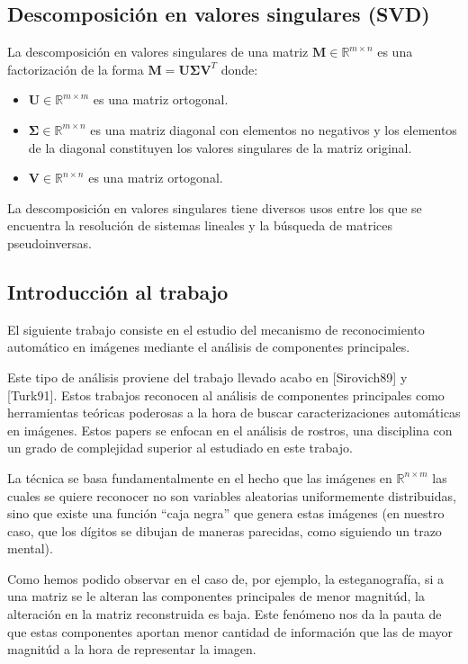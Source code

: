 \subsection{Descomposici\'on en valores singulares (SVD)}

La descomposici\'on en valores singulares de una matriz $\mathbf{M} \in \mathbb{R}^{m \times n}$ es una factorizaci\'on de la forma $\mathbf{M} =
\mathbf{U} \boldsymbol{\Sigma} \mathbf{V}^T$ donde:

\begin{itemize}
  \item $\mathbf{U} \in \mathbb{R}^{m \times m}$ es una matriz ortogonal.
  \item $\boldsymbol{\Sigma} \in \mathbb{R}^{m \times n}$ es una matriz diagonal con elementos no negativos y los elementos de la
diagonal constituyen los valores singulares de la matriz original.
  \item $\mathbf{V} \in \mathbb{R}^{n \times n}$ es una matriz ortogonal.
\end{itemize}

La descomposici\'on en valores singulares tiene diversos usos entre los que se encuentra la resoluci\'on de
sistemas lineales y la b\'usqueda de matrices pseudoinversas.

\subsection{Introducci\'on al trabajo}

El siguiente trabajo consiste en el estudio del mecanismo de reconocimiento autom\'atico
en im\'agenes mediante el an\'alisis de componentes principales.

Este tipo de an\'alisis proviene del trabajo llevado acabo en [Sirovich89] y [Turk91]. Estos
trabajos reconocen al an\'alisis de componentes principales como herramientas te\'oricas poderosas
a la hora de buscar caracterizaciones autom\'aticas en im\'agenes. Estos papers se enfocan en el
an\'alisis de rostros, una disciplina con un grado de complejidad superior al estudiado en este
trabajo.

La t\'ecnica se basa fundamentalmente en el hecho que las im\'agenes en $\mathbb{R}^{n \times m}$ las cuales se
quiere reconocer no son variables aleatorias uniformemente distribuidas, sino
que existe una funci\'on ``caja negra'' que genera estas im\'agenes (en nuestro 
caso, que los d\'igitos se dibujan de maneras parecidas, como siguiendo un trazo mental).

Como hemos podido observar en el caso de, por ejemplo, la esteganograf\'ia, si a una matriz se le alteran
las componentes principales de menor magnit\'ud, la alteraci\'on en la matriz reconstruida es baja.
Este fen\'omeno nos da la pauta de que estas componentes aportan menor cantidad de informaci\'on
que las de mayor magnit\'ud a la hora de representar la imagen.

